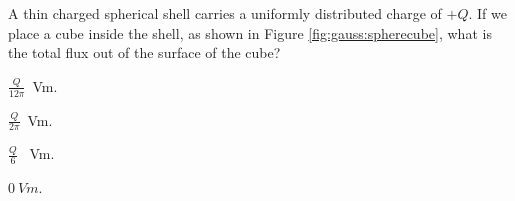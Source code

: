 \begin{checkpoint}\label{cp:gauss:unitsofflux}
	\begin{MCquestion}{A thin charged spherical shell carries a uniformly distributed charge of $+Q$. If we place a cube inside the shell, as shown in Figure \ref{fig:gauss:spherecube}, what is the total flux out of the surface of the cube?}
		\item $\frac{Q}{12\pi}$\SI{}{Vm}.
		\item $\frac{Q}{2\pi}$\SI{}{Vm}.
		\item $\frac{Q}{6}$ \SI{}{Vm}.
		\item $ \SI{0}{Vm}$. \correct
	\end{MCquestion}
\end{checkpoint}

